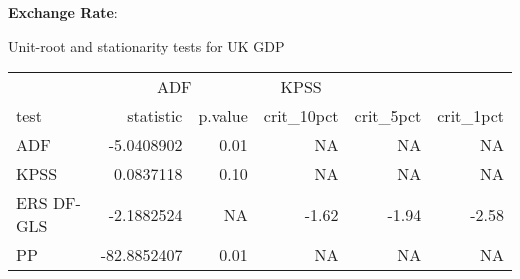 \documentclass[
]{article}
\begin{document}
\textbf{Exchange Rate}:

\bgroup \table[H]
\centering
\caption{\label{tab:unnamed-chunk-7}Unit-root and stationarity tests for UK GDP}
\centering
\begin{tabular}[t]{lrrrrr}
\toprule
\multicolumn{1}{c}{ } & \multicolumn{2}{c}{ADF} & \multicolumn{1}{c}{KPSS} \\
\cmidrule(l{3pt}r{3pt}){2-3} \cmidrule(l{3pt}r{3pt}){4-4}
test & statistic & p.value & crit\_10pct & crit\_5pct & crit\_1pct\\
\midrule
ADF & -5.0408902 & 0.01 & NA & NA & NA\\
KPSS & 0.0837118 & 0.10 & NA & NA & NA\\
ERS DF-GLS & -2.1882524 & NA & -1.62 & -1.94 & -2.58\\
PP & -82.8852407 & 0.01 & NA & NA & NA\\
\bottomrule
\end{tabular}
\endtable\egroup
\end{document}
